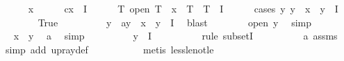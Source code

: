 \begin{isabellebody}
\ \ \ \ \isamarkupfalse%
\ x\isanewline
\ \ \ \ \isamarkupfalse%
\ c{\isacharcolon}{\kern0pt}{\isachardoublequoteopen}x\ {\isasymin}\ I{\isachardoublequoteclose}\isanewline
\ \ \ \ \isamarkupfalse%
\ {\isachardoublequoteopen}{\isasymexists}T{\isachardot}{\kern0pt}\ open\ T\ {\isasymand}\ x\ {\isasymin}\ T\ {\isasymand}\ T\ {\isasymsubseteq}\ I{\isachardoublequoteclose}\isanewline
\ \ \ \ \isamarkupfalse%
\ {\isacharparenleft}{\kern0pt}cases\ {\isachardoublequoteopen}{\isasymexists}y{\isachardot}{\kern0pt}\ y\ {\isacharless}{\kern0pt}\ x\ {\isasymand}\ y\ {\isasymin}\ I{\isachardoublequoteclose}{\isacharparenright}{\kern0pt}\isanewline
\ \ \ \ \ \ \isamarkupfalse%
\ True\isanewline
\ \ \ \ \ \ \isamarkupfalse%
\ \isamarkupfalse%
\ y\ \ a{\isacharcolon}{\kern0pt}{\isachardoublequoteopen}y\ {\isacharless}{\kern0pt}\ x\ {\isasymand}\ y\ {\isasymin}\ I{\isachardoublequoteclose}\ \isamarkupfalse%
\ blast\isanewline
\ \ \ \ \ \ \isamarkupfalse%
\ {\isachardoublequoteopen}open\ {\isacharbraceleft}{\kern0pt}y{\isacharless}{\kern0pt}{\isachardot}{\kern0pt}{\isachardot}{\kern0pt}{\isacharbraceright}{\kern0pt}{\isachardoublequoteclose}\ \isamarkupfalse%
\ simp\isanewline
\ \ \ \ \ \ \isamarkupfalse%
\ \isamarkupfalse%
\ {\isachardoublequoteopen}x\ {\isasymin}\ {\isacharbraceleft}{\kern0pt}y{\isacharless}{\kern0pt}{\isachardot}{\kern0pt}{\isachardot}{\kern0pt}{\isacharbraceright}{\kern0pt}{\isachardoublequoteclose}\ \isamarkupfalse%
\ a\ \isamarkupfalse%
\ simp\isanewline
\ \ \ \ \ \ \isamarkupfalse%
\ \isamarkupfalse%
\ {\isachardoublequoteopen}{\isacharbraceleft}{\kern0pt}y{\isacharless}{\kern0pt}{\isachardot}{\kern0pt}{\isachardot}{\kern0pt}{\isacharbraceright}{\kern0pt}\ {\isasymsubseteq}\ I{\isachardoublequoteclose}\isanewline
\ \ \ \ \ \ \ \ \isamarkupfalse%
\ {\isacharparenleft}{\kern0pt}rule\ subsetI{\isacharparenright}{\kern0pt}\isanewline
\ \ \ \ \ \ \ \ \isamarkupfalse%
\ a\ assms{\isacharparenleft}{\kern0pt}{}{\isacharparenright}{\kern0pt}\ \isamarkupfalse%
\ {\isacharparenleft}{\kern0pt}simp\ add{\isacharcolon}{\kern0pt}\ up{\isacharunderscore}{\kern0pt}ray{\isacharunderscore}{\kern0pt}def{\isacharparenright}{\kern0pt}\ \isanewline
\ \ \ \ \ \ \ \ \isamarkupfalse%
\ {\isacharparenleft}{\kern0pt}metis\ less{\isacharunderscore}{\kern0pt}le{\isacharunderscore}{\kern0pt}not{\isacharunderscore}{\kern0pt}le{\isacharparenright}{\kern0pt}\isanewline

\end{isabellebody}
